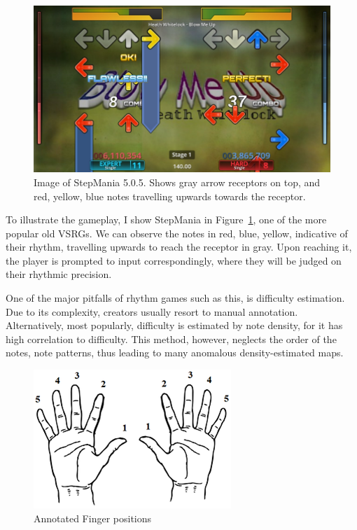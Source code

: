 \begin{figure}[H]
    \centering
    \includegraphics[scale=0.3]{imgs/StepMania_5.0.5_Demo}
    \caption{Image of StepMania 5.0.5. Shows gray arrow receptors on top, and red, yellow, blue notes travelling upwards towards the receptor.}
    \label{fig:stepmania}
\end{figure}

To illustrate the gameplay, I show StepMania in Figure~\ref{fig:stepmania}, one of the more popular old VSRGs.
We can observe the notes in red, blue, yellow, indicative of their rhythm, travelling upwards to reach the
receptor in gray.
Upon reaching it, the player is prompted to input correspondingly, where they will be
judged on their rhythmic precision.

One of the major pitfalls of rhythm games such as this, is difficulty estimation.
Due to its complexity, creators usually resort to manual annotation.
Alternatively, most popularly, difficulty is estimated by note density, for it has high correlation to difficulty.
This method, however, neglects the order of the notes, note patterns, thus leading to many anomalous density-estimated maps.

\begin{figure}[H]
    \centering
    \includegraphics{imgs/finger-notation}
    \caption{Annotated Finger positions}
    \label{fig:finger_notation}
\end{figure}
